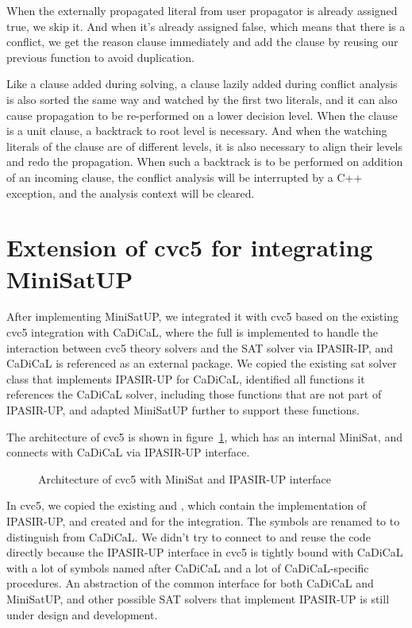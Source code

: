 When the externally propagated literal from user propagator is already assigned true, we skip it. And when it's already assigned false, which means that there is a conflict, we get the reason clause immediately and add the clause by reusing our previous function  to avoid duplication.

Like a clause added during solving, a clause lazily added during conflict analysis is also sorted the same way and watched by the first two literals, and it can also cause propagation to be re-performed on a lower decision level. When the clause is a unit clause, a backtrack to root level is necessary. And when the watching literals of the clause are of different levels, it is also necessary to align their levels and redo the propagation. When such a backtrack is to be performed on addition of an incoming clause, the conflict analysis will be interrupted by a C++ exception, and the analysis context will be cleared.

\section{Extension of cvc5 for integrating MiniSatUP}

After implementing MiniSatUP, we integrated it with cvc5 based on the existing cvc5 integration with CaDiCaL, where the full  is implemented to handle the interaction between cvc5 theory solvers and the SAT solver via IPASIR-IP, and CaDiCaL is referenced as an external package. We copied the existing sat solver class that implements IPASIR-UP for CaDiCaL, identified all functions it references the CaDiCaL solver, including those functions that are not part of IPASIR-UP, and adapted MiniSatUP further to support these functions.

The architecture of cvc5 is shown in figure~\ref{fig:cvc5}, which has an internal MiniSat, and connects with CaDiCaL via IPASIR-UP interface.

\begin{figure}
  \centering
  
  \caption{Architecture of cvc5 with MiniSat and IPASIR-UP interface}
  \label{fig:cvc5}
\end{figure}

In cvc5, we copied the existing  and , which contain the implementation of IPASIR-UP, and created  and  for the integration. The symbols are renamed to  to distinguish from CaDiCaL. We didn't try to connect to and reuse the code directly because the IPASIR-UP interface in cvc5 is tightly bound with CaDiCaL with a lot of symbols named after CaDiCaL and a lot of CaDiCaL-specific procedures. An abstraction of the common interface for both CaDiCaL and MiniSatUP, and other possible SAT solvers that implement IPASIR-UP is still under design and development.

